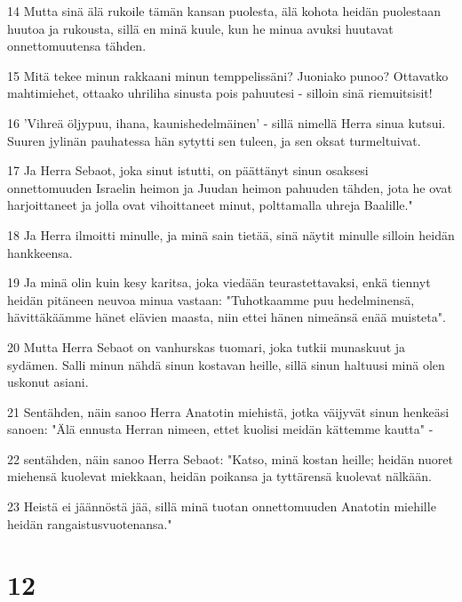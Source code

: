 \par 14 Mutta sinä älä rukoile tämän kansan puolesta, älä kohota heidän puolestaan huutoa ja rukousta, sillä en minä kuule, kun he minua avuksi huutavat onnettomuutensa tähden.
\par 15 Mitä tekee minun rakkaani minun temppelissäni? Juoniako punoo? Ottavatko mahtimiehet, ottaako uhriliha sinusta pois pahuutesi - silloin sinä riemuitsisit!
\par 16 'Vihreä öljypuu, ihana, kaunishedelmäinen' - sillä nimellä Herra sinua kutsui. Suuren jylinän pauhatessa hän sytytti sen tuleen, ja sen oksat turmeltuivat.
\par 17 Ja Herra Sebaot, joka sinut istutti, on päättänyt sinun osaksesi onnettomuuden Israelin heimon ja Juudan heimon pahuuden tähden, jota he ovat harjoittaneet ja jolla ovat vihoittaneet minut, polttamalla uhreja Baalille."
\par 18 Ja Herra ilmoitti minulle, ja minä sain tietää, sinä näytit minulle silloin heidän hankkeensa.
\par 19 Ja minä olin kuin kesy karitsa, joka viedään teurastettavaksi, enkä tiennyt heidän pitäneen neuvoa minua vastaan: "Tuhotkaamme puu hedelminensä, hävittäkäämme hänet elävien maasta, niin ettei hänen nimeänsä enää muisteta".
\par 20 Mutta Herra Sebaot on vanhurskas tuomari, joka tutkii munaskuut ja sydämen. Salli minun nähdä sinun kostavan heille, sillä sinun haltuusi minä olen uskonut asiani.
\par 21 Sentähden, näin sanoo Herra Anatotin miehistä, jotka väijyvät sinun henkeäsi sanoen: "Älä ennusta Herran nimeen, ettet kuolisi meidän kättemme kautta" -
\par 22 sentähden, näin sanoo Herra Sebaot: "Katso, minä kostan heille; heidän nuoret miehensä kuolevat miekkaan, heidän poikansa ja tyttärensä kuolevat nälkään.
\par 23 Heistä ei jäännöstä jää, sillä minä tuotan onnettomuuden Anatotin miehille heidän rangaistusvuotenansa."

\chapter{12}

